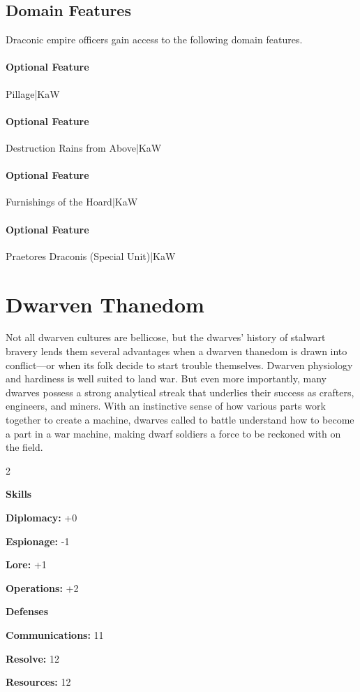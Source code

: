 \documentclass[10pt,a4paper,twoside,bg=print,twocolumn,openany,nodeprecatedcode]{dndbook}
\begin{document}
\subsection{Domain Features}
Draconic empire officers gain access to the following domain features.

\paragraph{Optional Feature}
Pillage|KaW

\paragraph{Optional Feature}
Destruction Rains from Above|KaW

\paragraph{Optional Feature}
Furnishings of the Hoard|KaW

\paragraph{Optional Feature}
Praetores Draconis (Special Unit)|KaW

\section{Dwarven Thanedom}
Not all dwarven cultures are bellicose, but the dwarves' history of stalwart bravery lends them several advantages when a dwarven thanedom is drawn into conflict—or when its folk decide to start trouble themselves. Dwarven physiology and hardiness is well suited to land war. But even more importantly, many dwarves possess a strong analytical streak that underlies their success as crafters, engineers, and miners. With an instinctive sense of how various parts work together to create a machine, dwarves called to battle understand how to become a part in a war machine, making dwarf soldiers a force to be reckoned with on the field.


\begin{itemize}
\begin{multicols}{2}
\item \textbf{Skills}
\item \textbf{Diplomacy:} +0
\item \textbf{Espionage:} -1
\item \textbf{Lore:} +1
\item \textbf{Operations:} +2
\item \textbf{Defenses}
\item \textbf{Communications:} 11
\item \textbf{Resolve:} 12
\item \textbf{Resources:} 12
\end{multicols}

\end{itemize}
\end{document}
